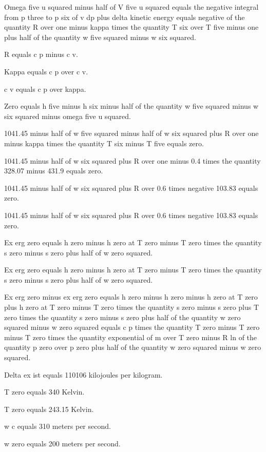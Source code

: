 Omega five u squared minus half of V five u squared equals the negative integral from p three to p six of v dp plus delta kinetic energy equals negative of the quantity R over one minus kappa times the quantity T six over T five minus one plus half of the quantity w five squared minus w six squared.

R equals c p minus c v.

Kappa equals c p over c v.

c v equals c p over kappa.

Zero equals h five minus h six minus half of the quantity w five squared minus w six squared minus omega five u squared.

1041.45 minus half of w five squared minus half of w six squared plus R over one minus kappa times the quantity T six minus T five equals zero.

1041.45 minus half of w six squared plus R over one minus 0.4 times the quantity 328.07 minus 431.9 equals zero.

1041.45 minus half of w six squared plus R over 0.6 times negative 103.83 equals zero.

1041.45 minus half of w six squared plus R over 0.6 times negative 103.83 equals zero.

Ex erg zero equals h zero minus h zero at T zero minus T zero times the quantity s zero minus s zero plus half of w zero squared.

Ex erg zero equals h zero minus h zero at T zero minus T zero times the quantity s zero minus s zero plus half of w zero squared.

Ex erg zero minus ex erg zero equals h zero minus h zero minus h zero at T zero plus h zero at T zero minus T zero times the quantity s zero minus s zero plus T zero times the quantity s zero minus s zero plus half of the quantity w zero squared minus w zero squared equals c p times the quantity T zero minus T zero minus T zero times the quantity exponential of m over T zero minus R ln of the quantity p zero over p zero plus half of the quantity w zero squared minus w zero squared.

Delta ex ist equals 110106 kilojoules per kilogram.

T zero equals 340 Kelvin.

T zero equals 243.15 Kelvin.

w c equals 310 meters per second.

w zero equals 200 meters per second.